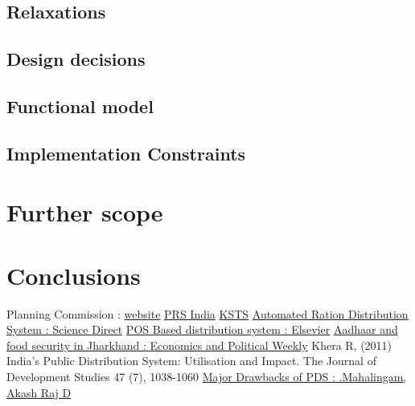 \documentclass{article}
\begin{document}
\subsection{Relaxations}

\subsection{Design decisions}
 
\subsection{Functional model}

\subsection{Implementation Constraints}

\section{Further scope}

\section{Conclusions}

\begin{thebibliography}{99}

 Planning Commission : \href{http://planningcommission.nic.in/plans/planrel/fiveyr/10th/volume2/v2_ch3_4.pdf}{website}
 \href{http://www.prsindia.org/administrator/uploads/general/1388728622~~TPDS%20Thematic%20Note.pdf}{PRS India}
 \href{http://www.kscst.iisc.ernet.in/spp/41_series/40S_bestprojreports/40S_BE_0366.pdf}{KSTS}
 \href{https://ac.els-cdn.com/S1877050915003324/1-s2.0-S1877050915003324-main.pdf?_tid=9ac7b378-d73e-435a-8ff6-14051bf3e25c&acdnat=1524581743_16e91753752ba258816d70c10d11c6c3}{Automated Ration Distribution System : Science Direct}
 \href{https://geleservices.com/GEL/Download/RFP-POS%20.pdf}{POS Based distribution system : Elsevier}
 \href{http://www.epw.in/journal/2017/50/special-articles/aadhaar-and-food-security-jharkhand.html}{Aadhaar and food security in Jharkhand : Economics and Political Weekly}
 Khera R, (2011) India's Public Distribution System: Utilisation and Impact. The Journal of Development Studies 47 (7), 1038-1060
 \href{http://www.ijsrd.com/articles/IJSRDV4I90439.pdf}{Major Drawbacks of PDS : .Mahalingam, Akash Raj D}


\end{thebibliography}
\end{document}
